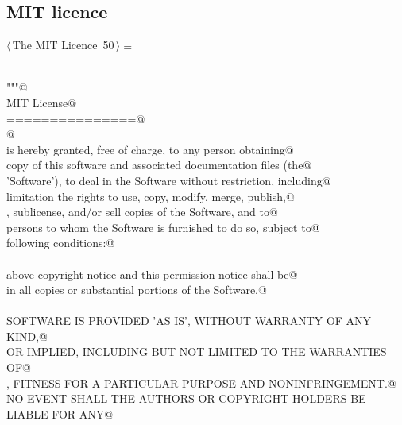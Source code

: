 \documentclass[11pt,oneside]{article}    %
\begin{document}
\subsection{MIT licence}
\begin{flushleft} \small \label{scrap80}
\protect{}$\langle\,$The MIT Licence\nobreak\ {\footnotesize 50}$\,\rangle\equiv$
\vspace{-1ex}
\begin{list}{}{} \item
\mbox{}\verb@@\\
\mbox{}\verb@"""@\\
\mbox{}\verb@The MIT License@\\
\mbox{}\verb@===============@\\
\mbox{}\verb@    @\\
\mbox{}\verb@Permission is hereby granted, free of charge, to any person obtaining@\\
\mbox{}\verb@a copy of this software and associated documentation files (the@\\
\mbox{}\verb@'Software'), to deal in the Software without restriction, including@\\
\mbox{}\verb@without limitation the rights to use, copy, modify, merge, publish,@\\
\mbox{}\verb@distribute, sublicense, and/or sell copies of the Software, and to@\\
\mbox{}\verb@permit persons to whom the Software is furnished to do so, subject to@\\
\mbox{}\verb@the following conditions:@\\
\mbox{}\verb@@\\
\mbox{}\verb@The above copyright notice and this permission notice shall be@\\
\mbox{}\verb@included in all copies or substantial portions of the Software.@\\
\mbox{}\verb@@\\
\mbox{}\verb@THE SOFTWARE IS PROVIDED 'AS IS', WITHOUT WARRANTY OF ANY KIND,@\\
\mbox{}\verb@EXPRESS OR IMPLIED, INCLUDING BUT NOT LIMITED TO THE WARRANTIES OF@\\
\mbox{}\verb@MERCHANTABILITY, FITNESS FOR A PARTICULAR PURPOSE AND NONINFRINGEMENT.@\\
\mbox{}\verb@IN NO EVENT SHALL THE AUTHORS OR COPYRIGHT HOLDERS BE LIABLE FOR ANY@\\

\end{list}
\end{flushleft}
\end{document}
